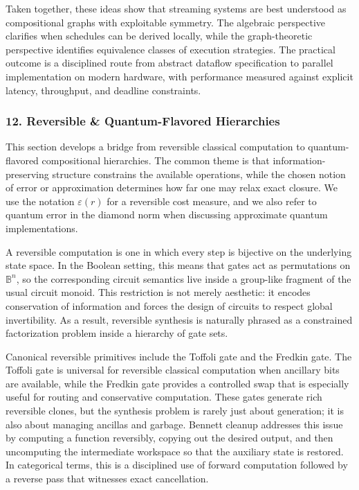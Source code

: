 \documentclass[11pt]{article}
\begin{document}
Taken together, these ideas show that streaming systems are best understood as compositional graphs with exploitable symmetry. The algebraic perspective clarifies when schedules can be derived locally, while the graph-theoretic perspective identifies equivalence classes of execution strategies. The practical outcome is a disciplined route from abstract dataflow specification to parallel implementation on modern hardware, with performance measured against explicit latency, throughput, and deadline constraints.



\subsubsection{12. Reversible \& Quantum-Flavored Hierarchies}


This section develops a bridge from reversible classical computation to quantum-flavored compositional hierarchies. The common theme is that information-preserving structure constrains the available operations, while the chosen notion of error or approximation determines how far one may relax exact closure. We use the notation \(\varepsilon(r)\) for a reversible cost measure, and we also refer to quantum error in the diamond norm when discussing approximate quantum implementations.

A reversible computation is one in which every step is bijective on the underlying state space. In the Boolean setting, this means that gates act as permutations on \(\mathbb{B}^n\), so the corresponding circuit semantics live inside a group-like fragment of the usual circuit monoid. This restriction is not merely aesthetic: it encodes conservation of information and forces the design of circuits to respect global invertibility. As a result, reversible synthesis is naturally phrased as a constrained factorization problem inside a hierarchy of gate sets.

Canonical reversible primitives include the Toffoli gate and the Fredkin gate. The Toffoli gate is universal for reversible classical computation when ancillary bits are available, while the Fredkin gate provides a controlled swap that is especially useful for routing and conservative computation. These gates generate rich reversible clones, but the synthesis problem is rarely just about generation; it is also about managing ancillas and garbage. Bennett cleanup addresses this issue by computing a function reversibly, copying out the desired output, and then uncomputing the intermediate workspace so that the auxiliary state is restored. In categorical terms, this is a disciplined use of forward computation followed by a reverse pass that witnesses exact cancellation.
\end{document}
